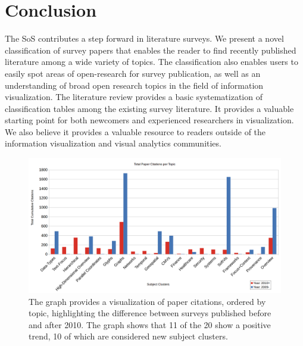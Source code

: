 \section{Conclusion}
The SoS contributes a step forward in literature surveys. We present a novel classification of survey papers that enables the reader to find recently published literature among a wide variety of topics. The classification also enables users to easily spot areas of open-research for survey publication, as well as an understanding of broad open research topics in the field of information visualization. The literature review provides a basic systematization of classification tables among the existing survey literature. It provides a valuable starting point for both newcomers and experienced researchers in visualization. We also believe it provides a valuable resource to readers outside of the information visualization and visual analytics communities. 


\begin{figure}[t]
\begin{center}
\includegraphics[width=1\textwidth]{images/CitedVis}
\caption{The graph provides a visualization of paper citations, ordered by topic, highlighting the difference between surveys published before and after 2010. The graph shows that 11 of the 20 show a positive trend, 10 of which are considered new subject clusters.} \label{fig: cited}
\end{center}
\end{figure}